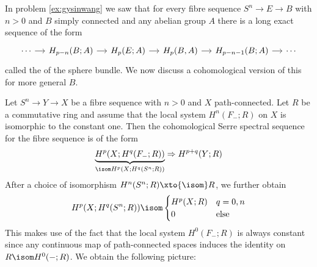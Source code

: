 In problem \ref{ex:gysinwang} we saw that for every fibre sequence $S^n \to E \to B$ with $n > 0$ and $B$ simply connected and any abelian group $A$ there is a long exact sequence of the form
\begin{equation*}
	\begin{tikzcd}[column sep = small]
		\cdots
				\ar[r]
			& H_{p - n}(B; A)
				\ar[r]
			& H_p(E; A)
				\ar[r]
			& H_p(B, A)
				\ar[r]
			& H_{p - n - 1}(B; A)
				\ar[r]
			& \cdots
	\end{tikzcd}
\end{equation*}
called the  of the sphere bundle.
We now discuss a cohomological version of this for more general $B$.

Let $S^n \to Y \to X$ be a fibre sequence with $n > 0$ and $X$ path-connected.
Let $R$ be a commutative ring and assume that the local system $H^n(F_{-}; R)$ on $X$ is isomorphic to the constant one.
Then the cohomological Serre spectral sequence for the fibre sequence is of the form
\begin{equation*}
	\underbrace{H^p(X; H^q(F_{-}; R))}_{\isom H^p(X; H^q(S^n; R))} \Rightarrow H^{p + q}(Y; R)
\end{equation*}
After a choice of isomorphism $H^n(S^n; R) \xto{\isom} R$, we further obtain
\begin{equation*}
	H^p(X; H^q(S^n; R)) \isom \begin{cases}
		H^p(X; R) 	& q = 0, n \\
		0 			& \text{else}
	\end{cases}
\end{equation*}
This makes use of the fact that the local system $H^0(F_{-}; R)$ is always constant since any continuous map of path-connected spaces induces the identity on $R \isom H^0({{-}}; R)$.
We obtain the following picture:
